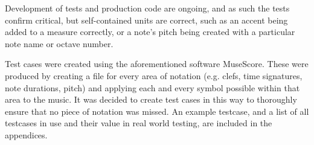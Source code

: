 Development of tests and production code are ongoing, and as such the tests confirm critical, but self-contained units are correct, such as an accent being added to a measure correctly, or a note's pitch being created with a particular note name or octave number.

Test cases were created using the aforementioned software MuseScore. These were produced by creating a file for every area of notation (e.g. clefs, time signatures, note durations, pitch) and applying each and every symbol possible within that area to the music. It was decided to create test cases in this way to thoroughly ensure that no piece of notation was missed. An example testcase, and a list of all testcases in use and their value in real world testing, are included in the appendices.